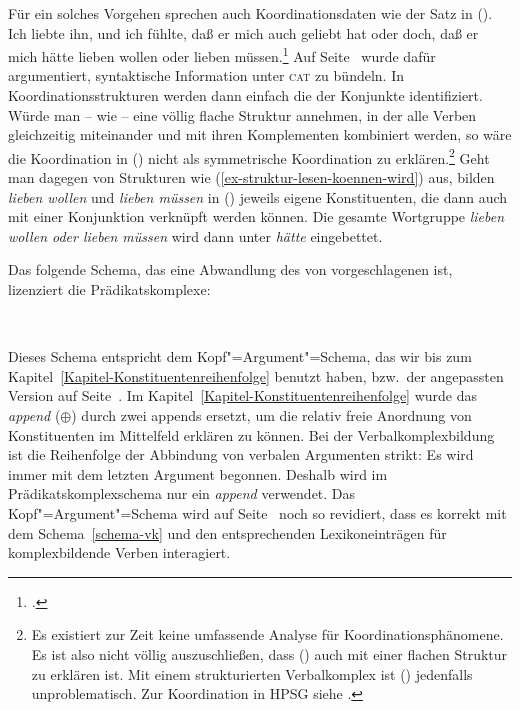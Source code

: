 Für ein solches Vorgehen sprechen auch Koordinationsdaten
wie der Satz in ().
\ea
Ich liebte ihn, und ich fühlte, daß er mich auch geliebt hat oder doch, daß er mich
hätte lieben wollen oder lieben müssen.\footnote{
        .
}
\z
Auf Seite~\pageref{page-symmetrische-koordination} wurde dafür argumentiert,
syntaktische Information unter \textsc{cat} zu bündeln. In Koordinationsstrukturen werden
dann einfach die \catwe der Konjunkte identifiziert. Würde man -- wie \zb \citet*{BvN96,BvN98a} --
eine völlig flache Struktur annehmen, in der alle Verben
gleichzeitig miteinander und mit ihren Komplementen kombiniert werden,
so wäre die Koordination in () nicht als symmetrische Koordination zu erklären.\footnote{
        Es existiert zur Zeit keine umfassende Analyse für Koordinationsphänomene. Es ist also
        nicht völlig auszuschließen, dass () auch mit einer flachen Struktur zu erklären ist.
        Mit einem strukturierten Verbalkomplex ist () jedenfalls unproblematisch. Zur
        Koordination in HPSG siehe .%
}
Geht man dagegen von Strukturen wie (\ref{ex-struktur-lesen-koennen-wird}) aus, bilden \emph{lieben wollen}
und \emph{lieben müssen} in () jeweils eigene Konstituenten, die dann auch mit einer Konjunktion
verknüpft werden können. Die gesamte Wortgruppe \emph{lieben wollen oder lieben müssen} wird dann unter
\emph{hätte} eingebettet.


Das folgende Schema, das eine Abwandlung des von \citeauthor{HN94a} vorgeschlagenen ist, lizenziert die Prädikatskomplexe:
\begin{samepage}
\begin{schema}[Prädikatskomplexschema]
\label{schema-vk}
 \impl\\
\end{schema}
\end{samepage}
%
Dieses Schema entspricht dem Kopf"=Argument"=Schema, das wir bis zum Kapitel~\ref{Kapitel-Konstituentenreihenfolge}
benutzt haben, bzw.\ der angepassten Version auf Seite~\pageref{schema-head-arg}.
Im Kapitel~\ref{Kapitel-Konstituentenreihenfolge} wurde das \emph{append} ($\oplus$) durch zwei appends
ersetzt, um die relativ freie Anordnung von Konstituenten im Mittelfeld erklären zu können.
Bei der Verbalkomplexbildung ist die Reihenfolge der Abbindung von verbalen Argumenten strikt: Es wird
immer mit dem letzten Argument begonnen. Deshalb wird im Prädikatskomplexschema nur ein \emph{append} 
verwendet. Das Kopf"=Argument"=Schema wird auf Seite~\pageref{schema-bin} noch so revidiert,
dass es korrekt mit dem Schema~\ref{schema-vk} und den entsprechenden Lexikoneinträgen für komplexbildende
Verben interagiert.

